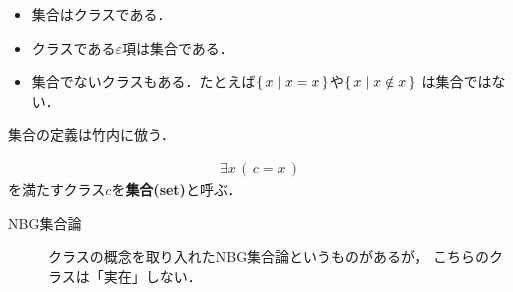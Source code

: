 	\begin{itemize}
		\item 集合はクラスである．
		\item クラスである$\varepsilon$項は集合である．
		\item 集合でないクラスもある．たとえば$\left\{\, x \mid x = x\, \right\}$や$\left\{\, x \mid x \notin x\, \right\}$
			は集合ではない．
	\end{itemize}
	
	集合の定義は竹内\cite{}に倣う．
	\begin{screen}
		\begin{dfn}[集合]
			\begin{align}
				\exists x\, (\, c = x\, )
			\end{align}
			を満たすクラス$c$を{\bf 集合(set)}と呼ぶ．
		\end{dfn}
	\end{screen}
	
	\begin{description}
		\item[NBG集合論] クラスの概念を取り入れたNBG集合論というものがあるが，
			こちらのクラスは「実在」しない．
	\end{description}